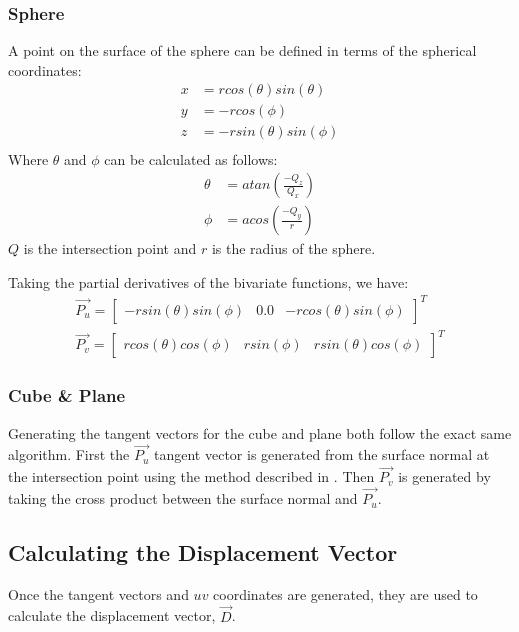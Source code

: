 \subsubsection*{Sphere}
A point on the surface of the sphere can be defined in terms of the spherical
coordinates:
\begin{equation}
\begin{split}
  x &= rcos(\theta)sin(\theta) \\
  y &= -rcos(\phi) \\
  z &= -rsin(\theta)sin(\phi) \\
\end{split}
\end{equation}
Where $\theta$ and $\phi$ can be calculated as follows:
\begin{equation}
\begin{split}
  \theta &= atan(\frac{-Q_{z}}{Q_{x}}) \\
  \phi &= acos(\frac{-Q_{y}}{r})
\end{split}
\end{equation}
$Q$ is the intersection point and $r$ is the radius of the sphere.

Taking the partial derivatives of the bivariate functions, we have:
\begin{equation}
\begin{split}
  \vec{P_{u}} = \begin{bmatrix} -rsin(\theta)sin(\phi) & 0.0 & 
  -rcos(\theta)sin(\phi) \end{bmatrix}^{T} \\
  \vec{P_{v}} = \begin{bmatrix} rcos(\theta)cos(\phi) & rsin(\phi) &
  rsin(\theta)cos(\phi) \end{bmatrix}^{T}
\end{split}
\end{equation}

\subsubsection*{Cube \& Plane}
Generating the tangent vectors for the cube and plane both follow the exact same
algorithm. First the $\vec{P_{u}}$ tangent vector is generated from the surface 
normal at the intersection point using the method described in 
\cite{6_hughes_möller_2005}. Then $\vec{P_{v}}$ is generated by taking the 
cross product between the surface normal and $\vec{P_{u}}$.

\subsection{Calculating the Displacement Vector}
Once the tangent vectors and $uv$ coordinates are generated, they are used to
calculate the displacement vector, $\vec{D}$.

